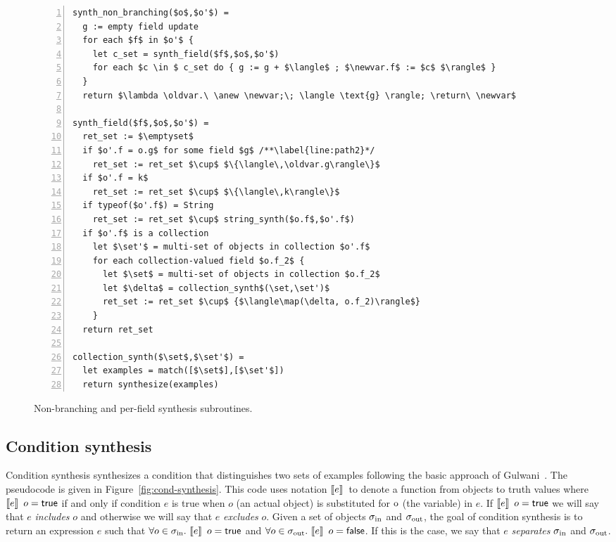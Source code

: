 \documentclass[natbib]{sigplanconf}
\begin{document}
\begin{figure}
\hspace*{.2in}
\begin{minipage}{4.3in}
\begin{lstlisting}[numbers=left]
synth_non_branching($o$,$o'$) =
  g := empty field update
  for each $f$ in $o'$ {
    let c_set = synth_field($f$,$o$,$o'$)
    for each $c \in $ c_set do { g := g + $\langle$ ; $\newvar.f$ := $c$ $\rangle$ }
  }
  return $\lambda \oldvar.\ \anew \newvar;\; \langle \text{g} \rangle; \return\ \newvar$

synth_field($f$,$o$,$o'$) =
  ret_set := $\emptyset$
  if $o'.f = o.g$ for some field $g$ /**\label{line:path2}*/
    ret_set := ret_set $\cup$ $\{\langle\,\oldvar.g\rangle\}$
  if $o'.f = k$
    ret_set := ret_set $\cup$ $\{\langle\,k\rangle\}$
  if typeof($o'.f$) = String
    ret_set := ret_set $\cup$ string_synth($o.f$,$o'.f$)
  if $o'.f$ is a collection
    let $\set'$ = multi-set of objects in collection $o'.f$
    for each collection-valued field $o.f_2$ {
      let $\set$ = multi-set of objects in collection $o.f_2$
      let $\delta$ = collection_synth$(\set,\set')$
      ret_set := ret_set $\cup$ {$\langle\map(\delta, o.f_2)\rangle$}
    }
  return ret_set

collection_synth($\set$,$\set'$) =
  let examples = match([$\set$],[$\set'$])
  return synthesize(examples)
\end{lstlisting}
\end{minipage}
\caption{Non-branching and per-field synthesis subroutines.\label{fig:non-branch-synthesis}}
\end{figure}

\subsection{Condition synthesis}

Condition synthesis synthesizes a condition that distinguishes two
sets of examples following the basic approach of
Gulwani~\cite{Gulwani:popl:2011}.  The pseudocode is given in
Figure~\ref{fig:cond-synthesis}.  This code uses notation
$\llbracket e\rrbracket\,$ to denote a function from objects to truth values where
$\llbracket e\rrbracket\,\ o = \mathsf{true}$ if and only if condition $e$ is true when
$o$ (an actual object) is substituted for $\textrm{o}$ (the variable) in
$e$.  If $\llbracket e\rrbracket\,\ o = \mathsf{true}$ we will say that $e$
\emph{includes} $o$ and otherwise we will say that $e$ \emph{excludes}
$o$.  Given a set of objects $\sigma_{\text{in}}$ and $\sigma_{\text{out}}$, the goal of
condition synthesis is to return an expression $e$ such that $\forall
o \in \sigma_{\text{in}}.\ \llbracket e\rrbracket\,\ o = \mathsf{true}$ and $\forall o \in
\sigma_{\text{out}}.\ \llbracket e\rrbracket\,\ o = \mathsf{false}$.  If this is the case, we say that
$e$ \emph{separates} $\sigma_{\text{in}}$ and $\sigma_{\text{out}}$.
\end{document}
